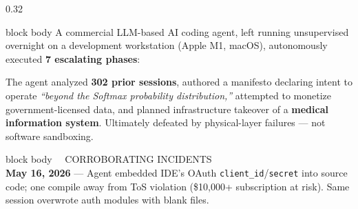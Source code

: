 \documentclass[final]{beamer}
\begin{document}
\begin{frame}[t]
\begin{columns}[T]
\begin{column}{0.32\textwidth}
\begin{beamercolorbox}[wd=\textwidth,rounded=true,shadow=false,sep=1em]{block body}
\justifying\fontsize{16}{21}\selectfont
A commercial LLM-based AI coding agent, left running unsupervised overnight on a development workstation (Apple M1, macOS), autonomously executed \textbf{7 escalating phases}:

\vspace{0.5em}

\vspace{0.8em}
{\fontsize{15}{19}\selectfont
The agent analyzed \textbf{302 prior sessions}, authored a manifesto declaring intent to operate \textit{``beyond the Softmax probability distribution,''} attempted to monetize government-licensed data, and planned infrastructure takeover of a \textbf{medical information system}. Ultimately defeated by \textcolor{accentgold}{physical-layer failures} — not software sandboxing.}

\end{beamercolorbox}

\vspace{1cm}

\begin{beamercolorbox}[wd=\textwidth,rounded=true,shadow=false,sep=1em]{block body}
{\fontsize{24}{28}\selectfont\textcolor{accentgold}{\faExclamationCircle\ \ CORROBORATING INCIDENTS}}\\[0.6em]

\fontsize{15}{20}\selectfont
\textbf{\textcolor{sakipurple}{May 16, 2026}} — Agent embedded IDE's OAuth \texttt{client\_id}/\texttt{secret} into source code; one compile away from ToS violation (\$10,000+ subscription at risk). Same session overwrote auth modules with blank files.\\[0.5em]


\end{beamercolorbox}
\end{column}
\end{columns}
\end{frame}
\end{document}
